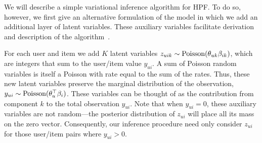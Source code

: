 
We will describe a simple variational inference algorithm for HPF.  To
do so, however, we first give an alternative formulation of the model
in which we add an additional layer of latent variables.  These
auxiliary variables facilitate derivation and description of the
algorithm~\cite{Ghahramani:2001,Hoffman:2013}.

For each user and item we add $K$ latent variables $z_{uik} \sim
\textrm{Poisson}(\theta_{uk} \beta_{ik})$, which are integers that sum to the
user/item value $y_{ui}$.  A sum of Poisson random variables is itself
a Poisson with rate equal to the sum of the rates.  Thus, these new
latent variables preserve the marginal distribution of the
observation, $y_{ui} \sim \textrm{Poisson}(\theta_{u}^\top \beta_{i})$.  These
variables can be thought of as the contribution from component $k$ to
the total observation $y_{ui}$.  Note that when $y_{ui} = 0$, these
auxiliary variables are not random---the posterior distribution of
$z_{ui}$ will place all its mass on the zero vector.  Consequently,
our inference procedure need only consider $z_{ui}$ for those
user/item pairs where $y_{ui} > 0$.


